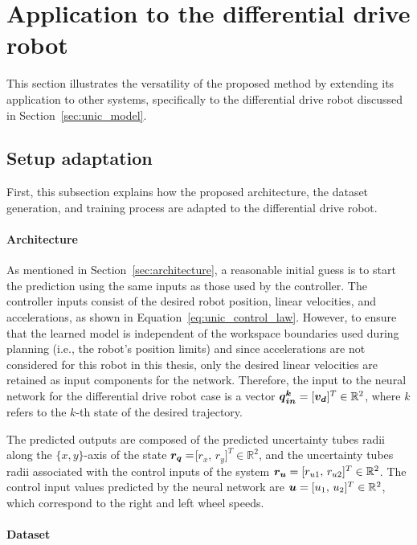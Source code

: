 \section{Application to the differential drive robot} \label{sec:DDR_appli}

This section illustrates the versatility of the proposed method by extending its application to other systems, specifically to the differential drive robot discussed in Section~\ref{sec:unic_model}.

\subsection{Setup adaptation}\label{sec:setup_adaptation}

First, this subsection explains how the proposed architecture, the dataset generation, and training process are adapted to the differential drive robot.

\paragraph{Architecture}

As mentioned in Section~\ref{sec:architecture}, a reasonable initial guess is to start the prediction using the same inputs as those used by the controller.
The  controller inputs consist of the desired robot position, linear velocities, and accelerations, as shown in Equation~\ref{eq:unic_control_law}. 
However, to ensure that the learned model is independent of the workspace boundaries used during planning (i.e., the robot's position limits) and since accelerations are not considered for this robot in this thesis, only the desired linear velocities are retained as input components for the network.
Therefore, the input to the neural network for the differential drive robot case is a vector $\boldsymbol{\boldsymbol{q}_{in}^k} = [\boldsymbol{v_d}]^T \in \mathbb{R}^2$, where $k$ refers to the $k$-th state of the desired trajectory.

The predicted outputs are composed of the predicted uncertainty tubes radii along the $\{x,y\}$-axis of the state $\boldsymbol{r_q}=$[$r_{x},\,r_{y}]^T \in \mathbb{R}^2$, and the uncertainty tubes radii associated with the control inputs of the system $\boldsymbol{r_u} = [r_{u1},\,r_{u2}]^T \in \mathbb{R}^2$.
The control input values predicted by the neural network are $\boldsymbol{u} = [u_1 ,\, u_2]^T \in \mathbb{R}^2$, which correspond to the right and left wheel speeds.

\paragraph{Dataset}


